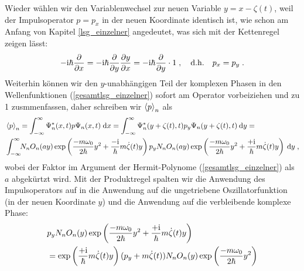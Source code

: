     Wieder wählen wir den Variablenwechsel zur neuen Variable $y=x-\zeta(t)$, weil der Impulsoperator $p=p_x$ in der neuen Koordinate identisch ist, wie schon am Anfang von Kapitel \ref{lsg_einzelner} angedeutet, was sich mit der Kettenregel zeigen lässt:
    \begin{equation}
      -\text i\hbar \frac{\partial}{\partial x} = -\text i\hbar \frac{\partial}{\partial y}\frac{\partial y}{\partial x} = -\text i\hbar \frac{\partial}{\partial y} \cdot 1 \; , \quad \text{d.h.} \quad p_x = p_y \; .
    \end{equation}
    Weiterhin können wir den $y$-unabhängigen Teil der komplexen Phasen in den Wellenfunktionen (\ref{gesamtlsg_einzelner}) sofort am Operator vorbeiziehen und zu 1 zusmmenfassen, daher schreiben wir $\braket{p}_n$ als
    \begin{align}
      &\braket{p}_n = \int_{-\infty}^{\infty} \Psi^*_n(x,t) p \Psi_n(x,t) \; \text dx
      = \int_{-\infty}^{\infty} \Psi^*_n(y+\zeta(t),t) p_y \Psi_n(y+\zeta(t),t) \: \text dy= \notag\\
      &\int_{-\infty}^{\infty} \!\! N_nO_n(ay)\exp\left(\frac{-m\omega_0}{2\hbar}y^2+\frac{-\text i}{\hbar}m\dot{\zeta}(t)y\right) p_y N_nO_n(ay)\exp\left(\frac{-m\omega_0}{2\hbar}y^2+\frac{+\text i}{\hbar}m\dot{\zeta}(t)y\right) \: \text dy \; ,
      \label{spaste}
    \end{align}
    wobei der Faktor im Argument der Hermit-Polynome (\ref{gesamtlsg_einzelner}) als $a$ abgekürtzt wird.
    Mit der Produktregel spalten wir die Anwendung des Impulsoperators auf in die Anwendung auf die ungetriebene Oszillatorfunktion (in der neuen Koordinate $y$) und die Anwendung auf die verbleibende komplexe Phase:
    \begin{align}
      &p_y N_nO_n(y)\exp\left(\frac{-m\omega_0}{2\hbar}y^2+\frac{+\text i}{\hbar}m\dot{\zeta}(t)y\right)  \notag\\
      &= \exp\left(\frac{+\text i}{\hbar}m\dot{\zeta}(t)y\right) (p_y+m\dot \zeta(t))N_nO_n(y)\exp\left(\frac{-m\omega_0}{2\hbar}y^2\right)
      \label{spaste2}
    \end{align}
